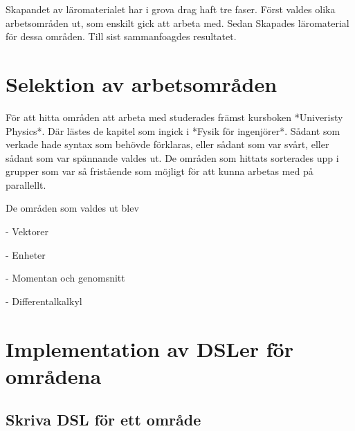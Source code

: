 \begin{binge}
Skapandet av läromaterialet har i grova drag haft tre faser. Först valdes olika
arbetsområden ut, som enskilt gick att arbeta med. Sedan Skapades läromaterial
för dessa områden. Till sist sammanfoagdes resultatet.



\section{Selektion av arbetsområden}


För att hitta områden att arbeta med studerades främst kursboken *Univeristy
Physics*. Där lästes de kapitel som ingick i *Fysik för ingenjörer*. Sådant som
verkade hade syntax som behövde förklaras, eller sådant som var svårt, eller
sådant som var spännande valdes ut. De områden som hittats sorterades upp i
grupper som var så fristående som möjligt för att kunna arbetas med på
parallellt.

De områden som valdes ut blev

- Vektorer

- Enheter

- Momentan och genomsnitt

- Differentalkalkyl


\section{Implementation av DSLer för områdena}

\subsection{Skriva DSL för ett område}


\end{binge}
